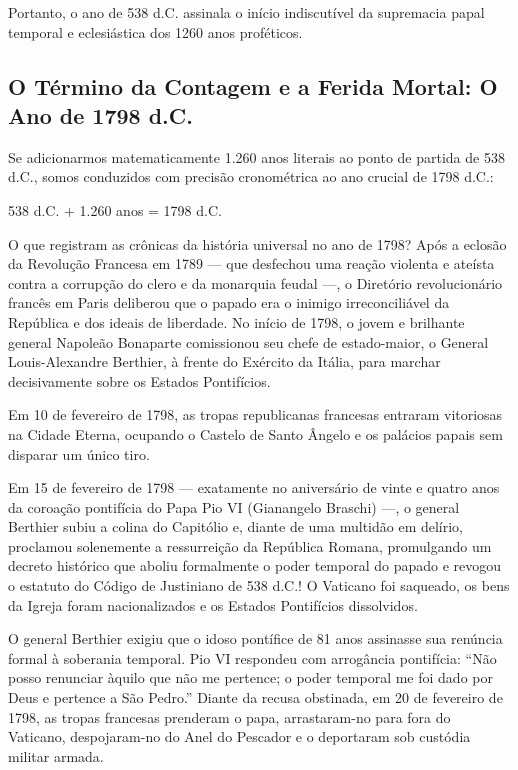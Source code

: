 \documentclass[11pt,a4paper,openany]{book}
\begin{document}
Portanto, o ano de 538 d.C. assinala o início indiscutível da supremacia papal temporal e eclesiástica dos 1260 anos proféticos.



\subsection{O Término da Contagem e a Ferida Mortal: O Ano de 1798 d.C.}


Se adicionarmos matematicamente 1.260 anos literais ao ponto de partida de 538 d.C., somos conduzidos com precisão cronométrica ao ano crucial de 1798 d.C.:

538 d.C. + 1.260 anos = 1798 d.C.

O que registram as crônicas da história universal no ano de 1798?
Após a eclosão da Revolução Francesa em 1789 — que desfechou uma reação violenta e ateísta contra a corrupção do clero e da monarquia feudal —, o Diretório revolucionário francês em Paris deliberou que o papado era o inimigo irreconciliável da República e dos ideais de liberdade. No início de 1798, o jovem e brilhante general Napoleão Bonaparte comissionou seu chefe de estado-maior, o General Louis-Alexandre Berthier, à frente do Exército da Itália, para marchar decisivamente sobre os Estados Pontifícios.

Em 10 de fevereiro de 1798, as tropas republicanas francesas entraram vitoriosas na Cidade Eterna, ocupando o Castelo de Santo Ângelo e os palácios papais sem disparar um único tiro.

Em 15 de fevereiro de 1798 — exatamente no aniversário de vinte e quatro anos da coroação pontifícia do Papa Pio VI (Gianangelo Braschi) —, o general Berthier subiu a colina do Capitólio e, diante de uma multidão em delírio, proclamou solenemente a ressurreição da República Romana, promulgando um decreto histórico que aboliu formalmente o poder temporal do papado e revogou o estatuto do Código de Justiniano de 538 d.C.! O Vaticano foi saqueado, os bens da Igreja foram nacionalizados e os Estados Pontifícios dissolvidos.

O general Berthier exigiu que o idoso pontífice de 81 anos assinasse sua renúncia formal à soberania temporal. Pio VI respondeu com arrogância pontifícia: ``Não posso renunciar àquilo que não me pertence; o poder temporal me foi dado por Deus e pertence a São Pedro.'' Diante da recusa obstinada, em 20 de fevereiro de 1798, as tropas francesas prenderam o papa, arrastaram-no para fora do Vaticano, despojaram-no do Anel do Pescador e o deportaram sob custódia militar armada.
\end{document}
